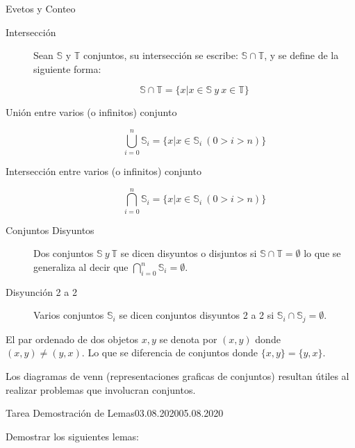 \documentclass[a4paper]{book}
\begin{document}
\begin{chapter}{Evetos y Conteo}
\begin{description}
        \item[Intersección] Sean $\mathbb S$ y $\mathbb T$ conjuntos, su
            intersección se escribe: $\mathbb S\cap \mathbb T$, y se define de
            la siguiente forma:

            \begin{equation*}
            \label{eq:1.13}
                \mathbb S \cap \mathbb T = \{x|x\in \mathbb S\ y\ x\in \mathbb T\}
            \end{equation*}

        \item[Unión entre varios (o infinitos) conjunto]
            \begin{equation*}
            \label{eq:1.14}
                \bigcup_{i=0}^{n}\mathbb S_{i} = \{x|x\in \mathbb S_{i}\ (0>i>n)\}
            \end{equation*}

        \item[Intersección entre varios (o infinitos) conjunto]
            \begin{equation*}
            \label{eq:1.14}
                \bigcap_{i=0}^{n}\mathbb S_{i} = \{x|x\in \mathbb S_{i}\ (0>i>n)\}
            \end{equation*}

        \item[Conjuntos Disyuntos] Dos conjuntos $\mathbb S\ y\ \mathbb T$ se
            dicen disyuntos o disjuntos si $\mathbb S\cap \mathbb T=\emptyset$
            lo que se generaliza al decir que $\bigcap_{i=0}^{n}\mathbb
            S_{i}=\emptyset$.

        \item[Disyunción 2 a 2] Varios conjuntos $\mathbb S_i$ se dicen
            conjuntos disyuntos 2 a 2 si $\mathbb S_i \cap \mathbb
            S_j=\emptyset$.
    \end{description}

    \begin{obs}
        El par ordenado de dos objetos $x,y$ se denota por $(x,y)$ donde
        $(x,y)\ne(y,x)$. Lo que se diferencia de conjuntos donde
        $\{x,y\}=\{y,x\}$.
    \end{obs}

    \begin{obs}
        Los diagramas de venn (representaciones graficas de conjuntos) resultan
        útiles al realizar problemas que involucran conjuntos.
    \end{obs}

    \begin{tarea}{Tarea Demostración de Lemas}{03.08.2020}{05.08.2020}
        \item Demostrar los siguientes lemas:


\end{tarea}
\end{chapter}
\end{document}
